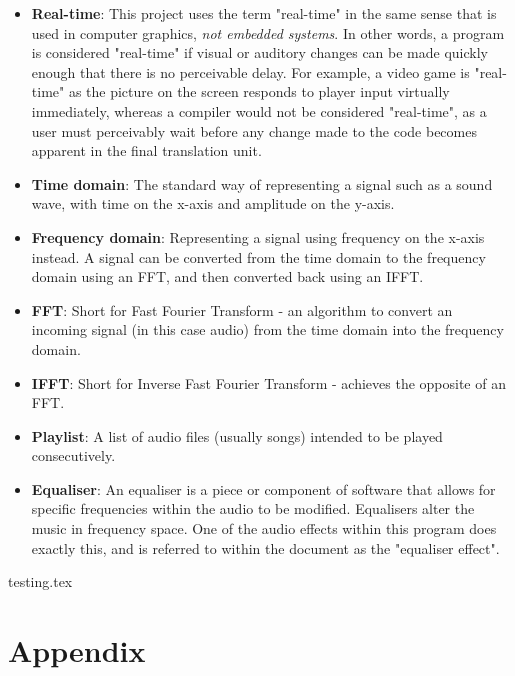 \documentclass{article}
\begin{document}
	\begin{itemize}
		\item \textbf{Real-time}: This project uses the term "real-time" in the same sense that is used in computer graphics, \textit{not embedded systems}. In other words, a program is considered "real-time" if visual or auditory changes can be made quickly enough that there is no perceivable delay. For example, a video game is "real-time" as the picture on the screen responds to player input virtually immediately, whereas a compiler would not be considered "real-time", as a user must perceivably wait before any change made to the code becomes apparent in the final translation unit.
		
		\item \textbf{Time domain}: The standard way of representing a signal such as a sound wave, with time on the x-axis and amplitude on the y-axis.
		
		\item \textbf{Frequency domain}: Representing a signal using frequency on the x-axis instead. A signal can be converted from the time domain to the frequency domain using an FFT, and then converted back using an IFFT.
		
		\item \textbf{FFT}: Short for Fast Fourier Transform - an algorithm to convert an incoming signal (in this case audio) from the time domain into the frequency domain.
		
		\item \textbf{IFFT}: Short for Inverse Fast Fourier Transform - achieves the opposite of an FFT.
		
		\item \textbf{Playlist}: A list of audio files (usually songs)  intended to be played consecutively.
		
		\item \textbf{Equaliser}: An equaliser is a piece or component of software that allows for specific frequencies within the audio to be modified. Equalisers alter the music in frequency space. One of the audio effects within this program does exactly this, and is referred to within the document as the "equaliser effect".
	\end{itemize}

	
	
	
	 {testing.tex}
	

	\section { Appendix  }
\end{document}
